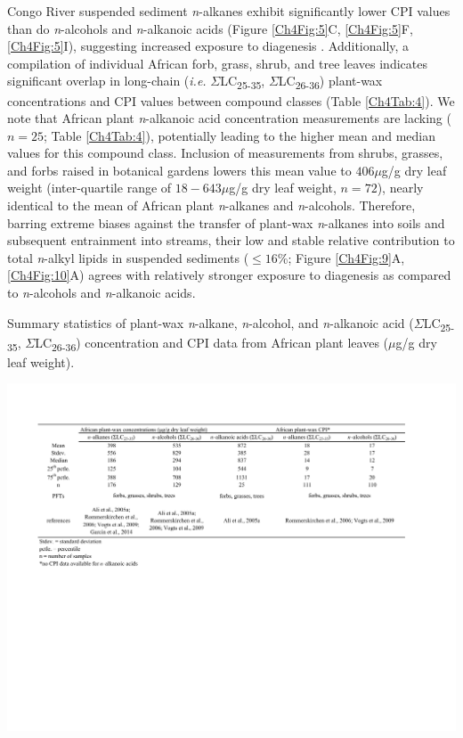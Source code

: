 Congo River suspended sediment \textit{n}-alkanes exhibit significantly lower CPI values than do \textit{n}-alcohols and \textit{n}-alkanoic acids (Figure \ref{Ch4Fig:5}C, \ref{Ch4Fig:5}F, \ref{Ch4Fig:5}I), suggesting increased exposure to diagenesis \citep{Meyers:1993vwa}. Additionally, a compilation of individual African forb, grass, shrub, and tree leaves indicates significant overlap in long-chain (\textit{i.e.} $\Sigma$LC\textsubscript{25-35}, $\Sigma$LC\textsubscript{26-36}) plant-wax concentrations and CPI values between compound classes (Table \ref{Ch4Tab:4}). We note that African plant \textit{n}-alkanoic acid concentration measurements are lacking ($n = 25$; Table \ref{Ch4Tab:4}), potentially leading to the higher mean and median values for this compound class. Inclusion of measurements from shrubs, grasses, and forbs raised in botanical gardens \citep{Gao:2014bk} lowers this mean value to $406 \mu$g/g dry leaf weight (inter-quartile range of $18 - 643 \mu$g/g dry leaf weight, $n = 72$), nearly identical to the mean of African plant \textit{n}-alkanes and \textit{n}-alcohols. Therefore, barring extreme biases against the transfer of plant-wax \textit{n}-alkanes into soils and subsequent entrainment into streams, their low and stable relative contribution to total \textit{n}-alkyl lipids in suspended sediments ($\leq 16$\%; Figure \ref{Ch4Fig:9}A, \ref{Ch4Fig:10}A) agrees with relatively stronger exposure to diagenesis as compared to \textit{n}-alcohols and \textit{n}-alkanoic acids.

\begin{table}
	\caption[Leaf lipid distributions and concentrations from African plants]{Summary statistics of plant-wax \textit{n}-alkane, \textit{n}-alcohol, and \textit{n}-alkanoic acid ($\Sigma$LC\textsubscript{25-35}, $\Sigma$LC\textsubscript{26-36}) concentration and CPI data from African plant leaves ($\mu$g/g dry leaf weight).}
	\centering
		\includegraphics{Thesis_Tables/Ch4Tab4}
	\label{Ch4Tab:4} 
\end{table}

